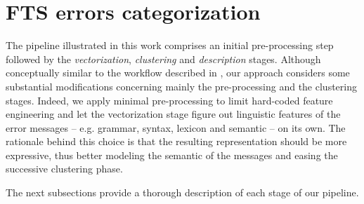 \section{FTS errors categorization} \label{sec:pipeline}

The pipeline illustrated in this work comprises an initial pre-processing step followed by the \textit{vectorization}, \textit{clustering} and \textit{description} stages.
Although conceptually similar to the workflow described in , our approach considers some substantial modifications concerning mainly the pre-processing and the clustering stages.
Indeed, we apply minimal pre-processing to limit hard-coded feature engineering and let the vectorization stage figure out linguistic features of the error messages -- e.g. grammar, syntax, lexicon and semantic -- on its own.
The rationale behind this choice is that the resulting representation should be more expressive, thus better modeling the semantic of the messages and easing the successive clustering phase.

The next subsections provide a thorough description of each stage of our pipeline.



